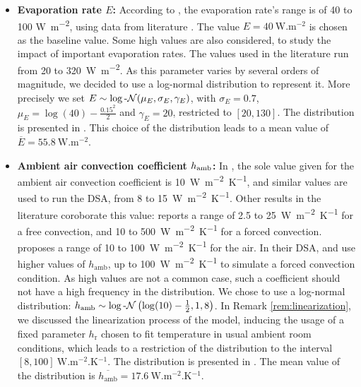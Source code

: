 \begin{itemize}
    \item \textbf{Evaporation rate $E$:} According to \cite{Scott_1988}, the evaporation rate's range is of 40 to 100 \unit{\watt.\meter^{-2}}, using data from literature \cite{adler53}.
    The value $E=\qty{40}{\watt.\meter^{-2}}$ is chosen as the baseline value.
    Some high values are also considered, to study the impact of important evaporation rates.
    The values used in the literature run from 20 to \qty{320}{\watt.\meter^{-2}}.
    As this parameter varies by several orders of magnitude, we decided to use a log-normal distribution to represent it.
    More precisely we set $E\sim \log\text{-}\mathcal{N}(\mu_E, \sigma_E, \gamma_E)$, with $\sigma_E = 0.7$, $\mu_E=\log(40)-\frac{0.15^2}{2}$ and $\gamma_E=20$, restricted to $[20, 130]$.
    The distribution is presented in .
    This choice of the distribution leads to a mean value of $\overline{E}=\qty{55.8}{\watt.\meter^{-2}}$.

    \item \textbf{Ambient air convection coefficient $h_\text{\normalfont amb}$:}
    In \cite{Scott_1988}, the sole value given for the ambient air convection coefficient is \qty{10}{\watt.\meter^{-2}.\kelvin^{-1}}, and similar values are used to run the DSA, from 8 to 15~\unit{\watt.\meter^{-2}.\kelvin^{-1}}.
    Other results in the literature coroborate this value: \cite[Table 12.2]{KOSKY2013259} reports a range of 2.5 to 25~\unit{\watt.\meter^{-2}.\kelvin^{-1}} for a free convection, and 10 to \qty{500}{\watt.\meter^{-2}.\kelvin^{-1}} for a forced convection.
    \cite{engeneer-edge} proposes a range of 10 to \qty{100}{\watt.\meter^{-2}.\kelvin^{-1}} for the air.
    In their DSA, \cite{NG2006268} and \cite{li2010} use higher values of $h_\text{amb}$, up to \qty{100}{\watt.\meter^{-2}.\kelvin^{-1}} to simulate a forced convection condition.
    As high values are not a common case, such a coefficient should not have a high frequency in the distribution.
    We chose to use a log-normal distribution: $h_\text{amb}\sim \log\text{-}\mathcal{N}\left(\log(10)-\frac{1}{2}, 1, 8\right)$.
    In Remark \ref{rem:linearization}, we discussed the linearization process of the model, inducing the usage of a fixed parameter $h_\text{r}$ chosen to fit temperature in usual ambient room conditions,
    which leads to a restriction of the distribution to the interval $[8, 100]~\unit{\watt.\meter^{-2}.\kelvin^{-1}}$.
    The distribution is presented in .
    The mean value of the distribution is $\overline{h_\text{amb}}=\qty{17.6}{\watt.\meter^{-2}.\kelvin^{-1}}$.


\end{itemize}

